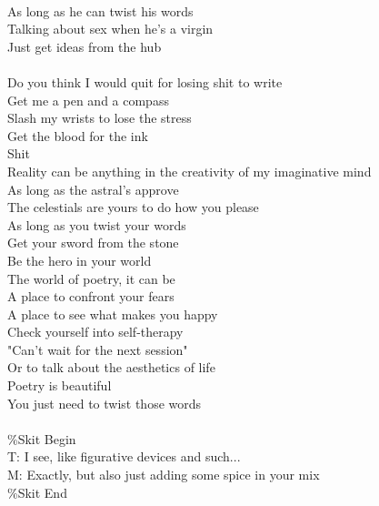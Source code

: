 \documentclass[12pt, b5paper, oneside]{book}
\begin{document}
\\As long as he can twist his words
\\Talking about sex when he's a virgin
\\Just get ideas from the hub
%
\\\\Do you think I would quit for losing shit to write
\\Get me a pen and a compass
\\Slash my wrists to lose the stress
\\Get the blood for the ink
\\Shit
\\Reality can be anything in the creativity of my imaginative mind 
\\As long as the astral's approve
\\The celestials are yours to do how you please
\\As long as you twist your words
\\Get your sword from the stone
\\Be the hero in your world
\\The world of poetry, it can be
\\A place to confront your fears
\\A place to see what makes you happy
\\Check yourself into self-therapy
\\"Can't wait for the next session"
\\Or to talk about the aesthetics of life
\\Poetry is beautiful
\\You just need to twist those words
%
\\\\\%Skit Begin
\\T: I see, like figurative devices and such...
\\M: Exactly, but also just adding some spice in your mix
\\\%Skit End
\newpage
\end{document}
